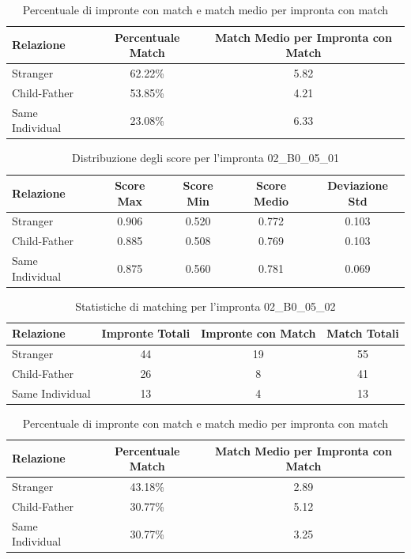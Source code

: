 \begin{table}[htbp]
\centering
\caption{Percentuale di impronte con match e match medio per impronta con match}
\label{tab:match_percentage_02_B0_05_01}
\begin{tabular}{|l|c|c|}
\hline
\textbf{Relazione} & \textbf{Percentuale Match} & \textbf{Match Medio per Impronta con Match} \\
\hline
Stranger & 62.22\% & 5.82 \\
\hline
Child-Father & 53.85\% & 4.21 \\
\hline
Same Individual & 23.08\% & 6.33 \\
\hline
\end{tabular}
\end{table}


\begin{table}[htbp]
\centering
\caption{Distribuzione degli score per l'impronta 02\_B0\_05\_01}
\label{tab:scores_02_B0_05_01}
\begin{tabular}{|l|c|c|c|c|}
\hline
\textbf{Relazione} & \textbf{Score Max} & \textbf{Score Min} & \textbf{Score Medio} & \textbf{Deviazione Std} \\
\hline
Stranger & 0.906 & 0.520 & 0.772 & 0.103 \\
\hline
Child-Father & 0.885 & 0.508 & 0.769 & 0.103 \\
\hline
Same Individual & 0.875 & 0.560 & 0.781 & 0.069 \\
\hline
\end{tabular}
\end{table}


\begin{table}[htbp]
\centering
\caption{Statistiche di matching per l'impronta 02\_B0\_05\_02}
\label{tab:results_02_B0_05_02}
\begin{tabular}{|l|c|c|c|}
\hline
\textbf{Relazione} & \textbf{Impronte Totali} & \textbf{Impronte con Match} & \textbf{Match Totali} \\
\hline
Stranger & 44 & 19 & 55 \\
\hline
Child-Father & 26 & 8 & 41 \\
\hline
Same Individual & 13 & 4 & 13 \\
\hline
\end{tabular}
\end{table}


\begin{table}[htbp]
\centering
\caption{Percentuale di impronte con match e match medio per impronta con match}
\label{tab:match_percentage_02_B0_05_02}
\begin{tabular}{|l|c|c|}
\hline
\textbf{Relazione} & \textbf{Percentuale Match} & \textbf{Match Medio per Impronta con Match} \\
\hline
Stranger & 43.18\% & 2.89 \\
\hline
Child-Father & 30.77\% & 5.12 \\
\hline
Same Individual & 30.77\% & 3.25 \\
\hline
\end{tabular}
\end{table}


